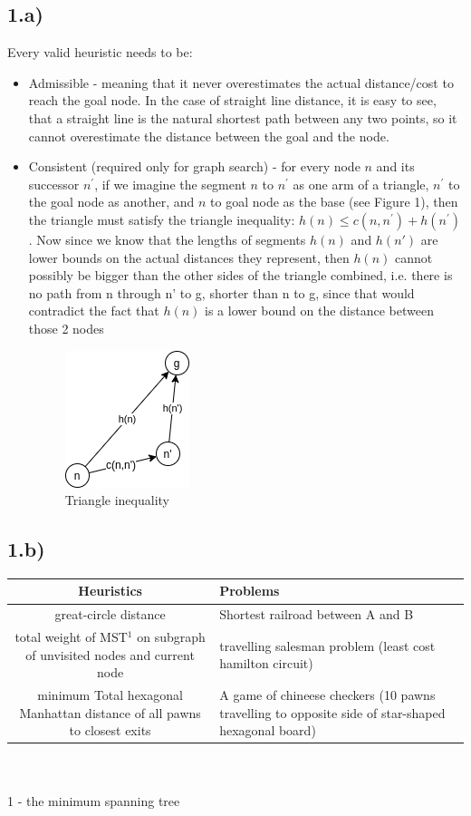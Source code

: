 \documentclass{report}
\begin{document}
\subsection*{1.a)}
Every valid heuristic needs to be:
\begin{itemize}
    \item Admissible - meaning that it never overestimates the actual distance/cost to reach the goal node. In the case of straight line distance, it is easy to see, that a straight line is the natural shortest path between any two points, so it cannot overestimate the distance between the goal and the node.
    \item Consistent (required only for graph search) - for every node $n$ and its successor $n^{'}$, if we imagine the segment $n$ to $n^{'}$ as one arm of a triangle, $n^{'}$ to the goal node as another, and $n$ to goal node as the base (see Figure 1), then the triangle must satisfy the triangle inequality: $h(n) \leq c(n,n^{'}) + h(n^{'})$. Now since we know that the lengths of segments $h(n)$ and $h(n')$ are lower bounds on the actual distances they represent, then $h(n)$ cannot possibly be bigger than the other sides of the triangle combined, i.e. there is no path from n through n' to g, shorter than n to g, since that would contradict the fact that $h(n)$ is a lower bound on the distance between those 2 nodes \\
    \begin{figure}[h]
        \centering
        \includegraphics[scale=0.5]{Custom_Latex/Years/Year2/Semester2/R&A/CW1/Inf2D-Ass1-20/images/consistent.png}
        \caption{Triangle inequality}
        \label{fig:my_label}
    \end{figure}
     
\end{itemize}
\subsection*{1.b)}
\begin{tabularx}{\linewidth}{|c | X|}
    \hline
    Heuristics & Problems \\ \hline
    great-circle distance & Shortest railroad between A and B\\ \hline
    total weight of MST$^{1}$ on subgraph of unvisited nodes and current node & travelling salesman problem (least cost hamilton circuit) \\ \hline
    minimum Total hexagonal Manhattan distance of all pawns to closest exits& A game of chineese checkers (10 pawns travelling to opposite side of star-shaped hexagonal board)\\ \hline
\end{tabularx}
\\\\
1 - the minimum spanning tree
\end{document}
